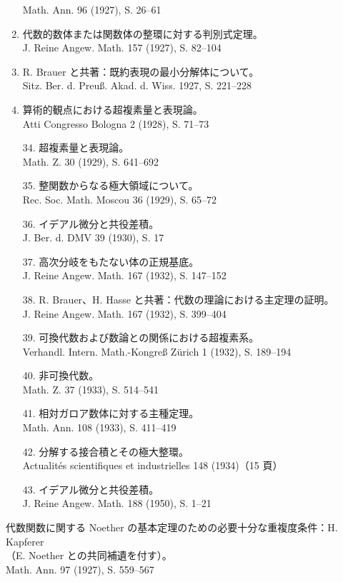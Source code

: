 \begin{enumerate}
Math. Ann. 96 (1927), S. 26--61
\item 代数的数体または関数体の整環に対する判別式定理。\\
J. Reine Angew. Math. 157 (1927), S. 82--104
\item R. Brauer と共著：既約表現の最小分解体について。\\
Sitz. Ber. d. Preuß. Akad. d. Wiss. 1927, S. 221--228
\item 算術的観点における超複素量と表現論。\\
Atti Congresso Bologna 2 (1928), S. 71--73
\item[34.] 超複素量と表現論。\\
Math. Z. 30 (1929), S. 641--692
\item[35.] 整関数からなる極大領域について。\\
Rec. Soc. Math. Moscou 36 (1929), S. 65--72
\item[36.] イデアル微分と共役差積。\\
J. Ber. d. DMV 39 (1930), S. 17
\item[37.] 高次分岐をもたない体の正規基底。\\
J. Reine Angew. Math. 167 (1932), S. 147--152
\item[38.] R. Brauer、H. Hasse と共著：代数の理論における主定理の証明。\\
J. Reine Angew. Math. 167 (1932), S. 399--404
\item[39.] 可換代数および数論との関係における超複素系。\\
Verhandl. Intern. Math.-Kongreß Zürich 1 (1932), S. 189--194
\item[40.] 非可換代数。\\
Math. Z. 37 (1933), S. 514--541
\item[41.] 相対ガロア数体に対する主種定理。\\
Math. Ann. 108 (1933), S. 411--419
\item[42.] 分解する接合積とその極大整環。\\
Actualités scientifiques et industrielles 148 (1934)（15 頁）
\item[43.] イデアル微分と共役差積。\\
J. Reine Angew. Math. 188 (1950), S. 1--21
\end{enumerate}

\noindent 代数関数に関する Noether の基本定理のための必要十分な重複度条件：H. Kapferer\\
（E. Noether との共同補遺を付す）。\\
Math. Ann. 97 (1927), S. 559--567

